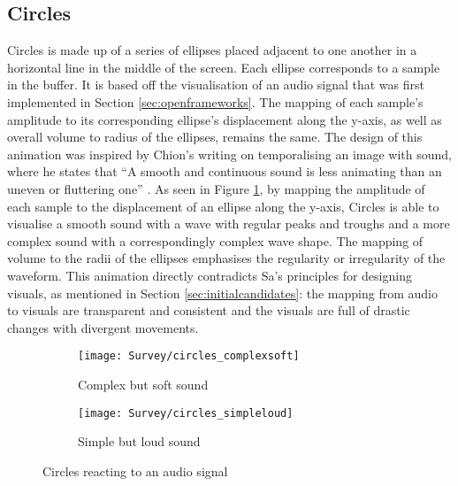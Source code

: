 \documentclass[../initial_thesis.tex]{subfiles}
\begin{document}
\subsection{Circles}
Circles is made up of a series of ellipses placed adjacent to one another in a horizontal line in the middle of the screen. Each ellipse corresponds to a sample in the buffer. It is based off the visualisation of an audio signal that was first implemented in Section \ref{sec:openframeworks}. The mapping of each sample's amplitude to its corresponding ellipse's displacement along the y-axis, as well as overall volume to radius of the ellipses, remains the same. The design of this animation was inspired by Chion's writing on temporalising an image with sound, where he states that ``A smooth and continuous sound is less animating than an uneven or fluttering one'' \cite{Chion1994}. As seen in Figure \ref{fig:circles1}, by mapping the amplitude of each sample to the displacement of an ellipse along the y-axis, Circles is able to visualise a smooth sound with a wave with regular peaks and troughs and a more complex sound with a correspondingly complex wave shape. The mapping of volume to the radii of the ellipses emphasises the regularity or irregularity of the waveform. This animation directly contradicts Sa's principles for designing visuals, as mentioned in Section \ref{sec:initialcandidates}: the mapping from audio to visuals are transparent and consistent and the visuals are full of drastic changes with divergent movements.

\begin{figure}
  \begin{subfigure}{0.5\textwidth}
    \texttt{[image: Survey/circles\_complexsoft]}
    \caption{Complex but soft sound}
  \end{subfigure} 
  \begin{subfigure}{0.5\textwidth}
    \texttt{[image: Survey/circles\_simpleloud]}
    \caption{Simple but loud sound}
  \end{subfigure}
  \caption{Circles reacting to an audio signal}
  \label{fig:circles1}
\end{figure}
\end{document}
